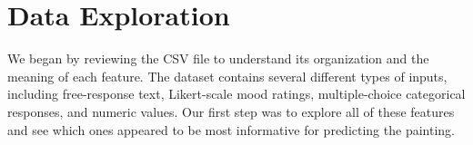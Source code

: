 \documentclass[12pt]{article}
\begin{document}



\section{Data Exploration}


We began by reviewing the CSV file to understand its organization and the meaning of each feature. The dataset contains several different types of inputs, including free-response text, Likert-scale mood ratings, multiple-choice categorical responses, and numeric values. Our first step was to explore all of these features and see which ones appeared to be most informative for predicting the painting.
\end{document}
